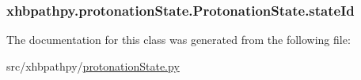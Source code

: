 \hypertarget{classxhbpathpy_1_1protonation_state_1_1_protonation_state_a1b11cc48856d50aa8021f10bb598f648}{
\subsubsection[{state\-Id}]{\setlength{\rightskip}{0pt plus 5cm}xhbpathpy.\-protonation\-State.\-Protonation\-State.\-state\-Id}}\label{classxhbpathpy_1_1protonation_state_1_1_protonation_state_a1b11cc48856d50aa8021f10bb598f648}


The documentation for this class was generated from the following file\-:\begin{DoxyCompactItemize}
\item 
src/xhbpathpy/\hyperlink{protonation_state_8py}{protonation\-State.\-py}\end{DoxyCompactItemize}
